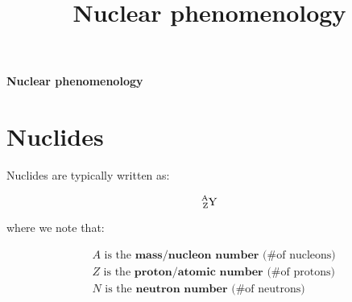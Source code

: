 \documentclass[10pt]{article}
\theoremstyle{definition}
\begin{document}
\setcounter{section}{1}
\title{Nuclear phenomenology}

\pagestyle{fancy}
\fancyhf{}
\setlength{\headheight}{12.0pt}

\begin{center}
{\LARGE \bf Nuclear phenomenology}\\
\end{center}

\section*{Nuclides}%


Nuclides are typically written as:

$$\ce{^{A}_{Z}Y}$$

where we note that:

\begin{align}
    &A\text{ is the }\textbf{mass/nucleon number}\text{ (\# of nucleons)}\\
    &Z\text{ is the }\textbf{proton/atomic number}\text{ (\# of protons)}\\
    &N\text{ is the }\textbf{neutron number}\text{ (\# of neutrons)}\\
\end{align}
\end{document}
